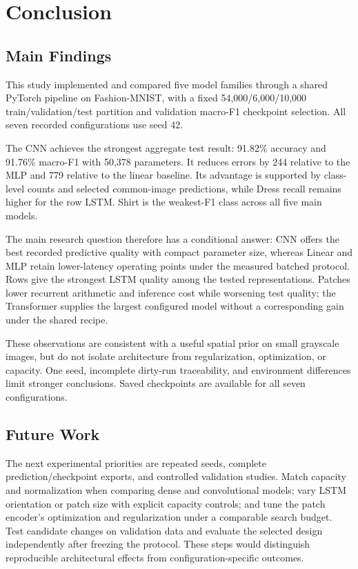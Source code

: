 \section{Conclusion}
\label{sec:conclusion}

\subsection{Main Findings}

This study implemented and compared five model families through a shared PyTorch pipeline on Fashion-MNIST, with a fixed 54,000/6,000/10,000 train/validation/test partition and validation macro-F1 checkpoint selection. All seven recorded configurations use seed 42.

The CNN achieves the strongest aggregate test result: 91.82\% accuracy and 91.76\% macro-F1 with 50,378 parameters. It reduces errors by 244 relative to the MLP and 779 relative to the linear baseline. Its advantage is supported by class-level counts and selected common-image predictions, while Dress recall remains higher for the row LSTM. Shirt is the weakest-F1 class across all five main models.

The main research question therefore has a conditional answer: CNN offers the best recorded predictive quality with compact parameter size, whereas Linear and MLP retain lower-latency operating points under the measured batched protocol. Rows give the strongest LSTM quality among the tested representations. Patches lower recurrent arithmetic and inference cost while worsening test quality; the Transformer supplies the largest configured model without a corresponding gain under the shared recipe.

These observations are consistent with a useful spatial prior on small grayscale images, but do not isolate architecture from regularization, optimization, or capacity. One seed, incomplete dirty-run traceability, and environment differences limit stronger conclusions. Saved checkpoints are available for all seven configurations.

\subsection{Future Work}

The next experimental priorities are repeated seeds, complete prediction/checkpoint exports, and controlled validation studies. Match capacity and normalization when comparing dense and convolutional models; vary LSTM orientation or patch size with explicit capacity controls; and tune the patch encoder's optimization and regularization under a comparable search budget. Test candidate changes on validation data and evaluate the selected design independently after freezing the protocol. These steps would distinguish reproducible architectural effects from configuration-specific outcomes.
